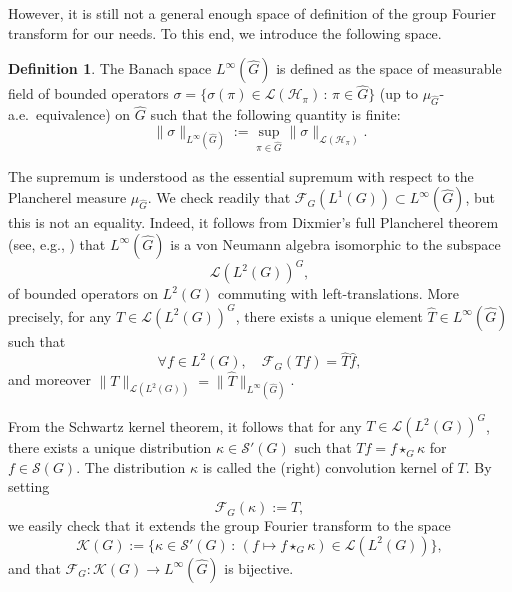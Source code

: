 \documentclass[12pt,a4paper]{amsart}
\theoremstyle{plain}
\theoremstyle{definition}
\newtheorem{definition}[theorem]{Definition}
\theoremstyle{remark}
\numberwithin{equation}{section}
\theoremstyle{definition}
\def \Ghat{\widehat{G}}
\def \cH{\mathcal{H}}
\def \cF{\mathcal{F}}
\numberwithin{equation}{section}
\begin{document}
However, it is still not a general enough space of definition of the group Fourier transform for our needs. To this end, we introduce the following space.

\begin{definition}
 \label{def:Linfty}
 The Banach space $L^\infty(\Ghat)$ is defined as the space of measurable field of bounded operators $\sigma= \{\sigma(\pi)\in\mathcal{L}(\cH_\pi)\,:\,\pi\in\Ghat\}$ 
 (up to $\mu_{\Ghat}$-a.e.~equivalence) on $\Ghat$ such that the following quantity is finite:
 \begin{equation*}
 \|\sigma\|_{L^\infty(\Ghat)} := \sup_{\pi\in\Ghat}\|\sigma\|_{\mathcal{L}(\cH_\pi)}.
 \end{equation*} 
\end{definition}

The supremum is understood as the essential supremum with respect to the Plancherel measure $\mu_{\Ghat}$. We check readily that $\cF_G(L^1(G)) \subset L^\infty(\Ghat)$, but this 
is not an equality. Indeed, it follows from Dixmier's full Plancherel theorem (see, e.g., \cite[Theorem B.2.32]{FR}) that $L^\infty(\Ghat)$ is a von Neumann algebra isomorphic to the subspace 
\begin{equation*}
 \mathcal{L}(L^2(G))^G,
\end{equation*}
of bounded operators on $L^2(G)$ commuting with left-translations. More precisely, for any $T\in \mathcal{L}(L^2(G))^G$, there exists a unique element $\hat{T}\in L^\infty(\Ghat)$ such
that 
\begin{equation*}
 \forall f\in L^2(G),\quad \cF_G(Tf) = \hat{T}\hat{f},
\end{equation*}
and moreover $\|T\|_{\mathcal{L}(L^2(G))} = \|\hat{T}\|_{L^\infty(\Ghat)}$.

From the Schwartz kernel theorem, it follows that for any $T\in\mathcal{L}(L^2(G))^G$, there exists a unique distribution $\kappa\in\mathcal{S}'(G)$ such that $Tf = f\star_G \kappa$ for $f\in\mathcal{S}(G)$.
The distribution $\kappa$ is called the (right) convolution kernel of $T$. By setting 
\begin{equation*}
 \cF_G(\kappa) := \hat{T},
\end{equation*}
we easily check that it extends the group Fourier transform to the space
\begin{equation*}
 \mathcal{K}(G) := \{\kappa\in\mathcal{S}'(G)\,:\,(f\mapsto f\star_G\kappa)\in\mathcal{L}(L^2(G))\},
\end{equation*}
and that $\cF_G:\mathcal{K}(G)\rightarrow L^\infty(\Ghat)$ is bijective.
\end{document}
